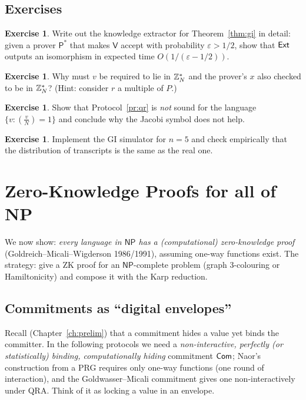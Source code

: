 \documentclass[11pt,a4paper]{report}
\theoremstyle{plain}
\theoremstyle{definition}
\newtheorem{exercise}[theorem]{Exercise}
\theoremstyle{remark}
\newcommand{\Prv}{\mathsf{P}}\newcommand{\Ver}{\mathsf{V}}
\newcommand{\NP}{\mathsf{NP}}\newcommand{\BPP}{\mathsf{BPP}}\newcommand{\IP}{\mathsf{IP}}
\newcommand{\Zs}[1]{\ZZ_{#1}^{*}}
\begin{document}
\section*{Exercises}
\begin{exercise}
Write out the knowledge extractor for Theorem~\ref{thm:gi} in detail: given a prover $\Prv^*$ that makes $\Ver$ accept with probability $\varepsilon>1/2$, show that $\mathsf{Ext}$ outputs an isomorphism in expected time $O(1/(\varepsilon-1/2))$.
\end{exercise}
\begin{exercise}
Why must $v$ be required to lie in $\Zs N$ and the prover's $x$ also checked to be in $\Zs N$? (Hint: consider $r$ a multiple of $P$.)
\end{exercise}
\begin{exercise}
Show that Protocol~\ref{pr:qr} is \emph{not} sound for the language $\{v:(\frac vN)=1\}$ and conclude why the Jacobi symbol does not help.
\end{exercise}
\begin{exercise}
Implement the GI simulator for $n=5$ and check empirically that the distribution of transcripts is the same as the real one.
\end{exercise}

\chapter{Zero-Knowledge Proofs for all of NP}
\label{ch:np}
We now show: \emph{every language in $\NP$ has a (computational) zero-knowledge proof} (Goldreich--Micali--Wigderson 1986/1991), assuming one-way functions exist. The strategy: give a ZK proof for an $\NP$-complete problem (graph 3-colouring or Hamiltonicity) and compose it with the Karp reduction.

\section{Commitments as ``digital envelopes''}
Recall (Chapter~\ref{ch:prelim}) that a commitment hides a value yet binds the committer. In the following protocols we need a \emph{non-interactive, perfectly (or statistically) binding, computationally hiding} commitment $\mathsf{Com}$; Naor's construction from a PRG \cite{Nao91} requires only one-way functions (one round of interaction), and the Goldwasser--Micali commitment gives one non-interactively under QRA. Think of it as locking a value in an envelope.
\end{document}
